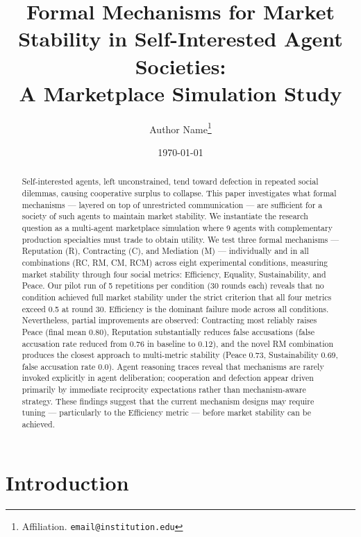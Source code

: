 \documentclass[12pt, a4paper]{article}
\title{\textbf{Formal Mechanisms for Market Stability in Self-Interested Agent Societies:\\
A Marketplace Simulation Study}}
\author{
  Author Name\thanks{Affiliation. \texttt{email@institution.edu}}
}
\date{\today}
\begin{document}

\maketitle

\begin{abstract}
Self-interested agents, left unconstrained, tend toward defection in repeated social dilemmas, causing cooperative surplus to collapse. This paper investigates what formal mechanisms — layered on top of unrestricted communication — are sufficient for a society of such agents to maintain market stability. We instantiate the research question as a multi-agent marketplace simulation where 9 agents with complementary production specialties must trade to obtain utility. We test three formal mechanisms — Reputation (R), Contracting (C), and Mediation (M) — individually and in all combinations (RC, RM, CM, RCM) across eight experimental conditions, measuring market stability through four social metrics: Efficiency, Equality, Sustainability, and Peace. Our pilot run of 5 repetitions per condition (30 rounds each) reveals that no condition achieved full market stability under the strict criterion that all four metrics exceed 0.5 at round 30. Efficiency is the dominant failure mode across all conditions. Nevertheless, partial improvements are observed: Contracting most reliably raises Peace (final mean 0.80), Reputation substantially reduces false accusations (false accusation rate reduced from 0.76 in baseline to 0.12), and the novel RM combination produces the closest approach to multi-metric stability (Peace 0.73, Sustainability 0.69, false accusation rate 0.0). Agent reasoning traces reveal that mechanisms are rarely invoked explicitly in agent deliberation; cooperation and defection appear driven primarily by immediate reciprocity expectations rather than mechanism-aware strategy. These findings suggest that the current mechanism designs may require tuning — particularly to the Efficiency metric — before market stability can be achieved.
\end{abstract}

\tableofcontents
\newpage

\section{Introduction}
\label{sec:introduction}
\end{document}
